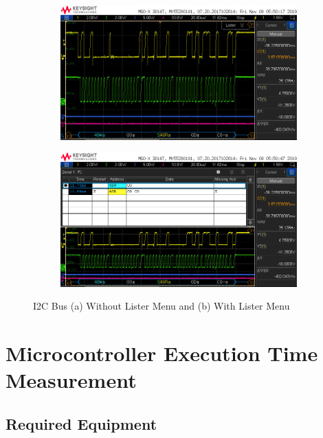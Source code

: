 \documentclass{article}
\begin{document}
  \begin{figure}[ht]
    \begin{subfigure}[b]{.5\textwidth}
      \includegraphics[width=\linewidth]{images/i2c/i2c.jpg}
      \caption{}
      \label{fig:i2c}
    \end{subfigure}
    \begin{subfigure}[b]{.5\textwidth}
      \includegraphics[width=\linewidth]{images/i2c/i2c_lister.jpg}
      \caption{}
      \label{fig:i2c_lister}
    \end{subfigure}
    \caption{I2C Bus (a) Without Lister Menu and (b) With Lister Menu}
    \label{fig:i2c_decode}
  \end{figure}

  \section{Microcontroller Execution Time Measurement}

  \subsection{Required Equipment}
\end{document}
